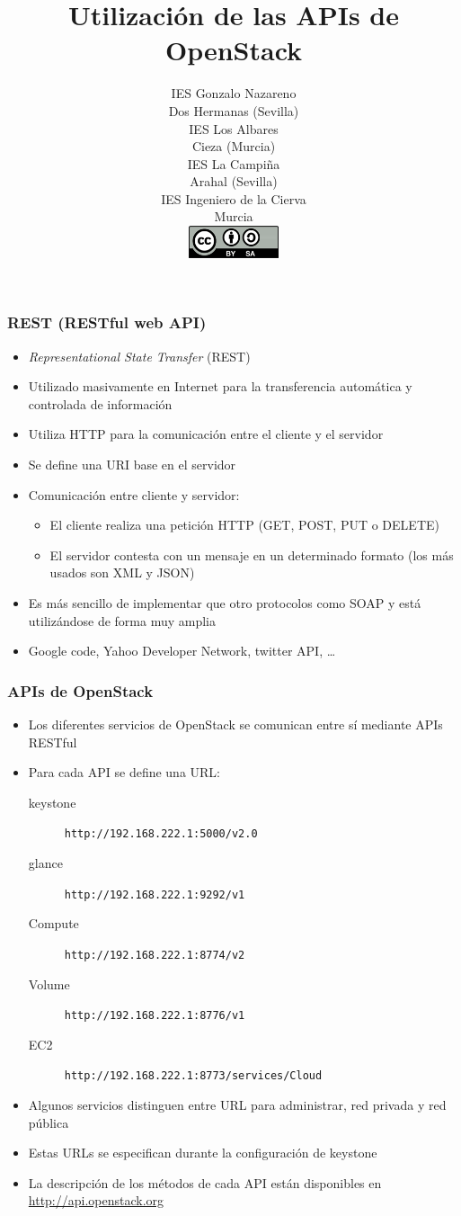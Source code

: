 \documentclass{beamer}
\author{
\small{IES Gonzalo Nazareno}\\
\tiny{Dos Hermanas (Sevilla)}\\
\small{IES Los Albares}\\
\tiny{Cieza (Murcia)}\\
\small{IES La Campiña}\\
\tiny{Arahal (Sevilla)}\\
\small{IES Ingeniero de la Cierva}\\
\tiny{Murcia}\\
\vspace{.5cm}
\includegraphics[width=0.2\textwidth]{cc_by_sa.png}}
\title{Utilización de las APIs de OpenStack}
\institute{Proyecto de Innovación\\ {\color{white} .\\} \emph{Implantación y puesta a punto de la infraestructura de un cloud computing privado para el despliegue de servicios en la nube}}
\begin{document}
\begin{frame}[t,plain]
\titlepage
\end{frame}

\begin{frame}
   \frametitle{REST (RESTful web API)}
  \begin{itemize}
  \item \emph{Representational State Transfer} (REST)
  \item Utilizado masivamente en Internet para la transferencia automática y
    controlada de información
  \item Utiliza HTTP para la comunicación entre el cliente y el servidor
  \item Se define una URI base en el servidor
  \item Comunicación entre cliente y servidor:
    \begin{itemize}
    \item El cliente realiza una petición HTTP (GET, POST, PUT o DELETE)
    \item El servidor contesta con un mensaje en un determinado
      formato (los más usados son XML y JSON)
    \end{itemize}
  \item Es más sencillo de implementar que otro protocolos como SOAP y está
    utilizándose de forma muy amplia
  \item Google code, Yahoo Developer Network, twitter API, \ldots
  \end{itemize} 
\end{frame}

\begin{frame}
  \frametitle{APIs de OpenStack}
  \begin{itemize}
  \item Los diferentes servicios de OpenStack se comunican entre sí mediante
    APIs RESTful
  \item Para cada API se define una URL:
    \begin{description}
    \item[keystone] \texttt{http://192.168.222.1:5000/v2.0}
    \item[glance] \texttt{http://192.168.222.1:9292/v1}
    \item[Compute] \texttt{http://192.168.222.1:8774/v2}
    \item[Volume] \texttt{http://192.168.222.1:8776/v1}
    \item[EC2] \texttt{http://192.168.222.1:8773/services/Cloud}
    \end{description}
  \item Algunos servicios distinguen entre URL para administrar, red privada y
    red pública
  \item Estas URLs se especifican durante la configuración de keystone
  \item La descripción de los métodos de cada API están disponibles en \url{http://api.openstack.org}
  \end{itemize}
\end{frame}
\end{document}
